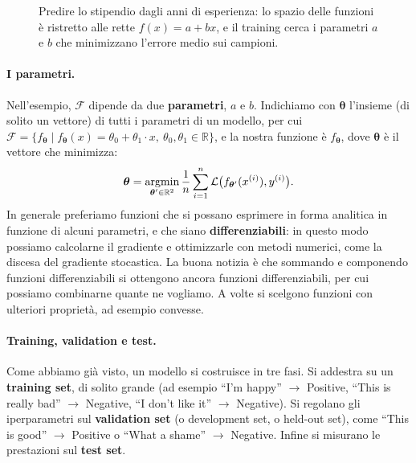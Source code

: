 \begin{figure}[htbp]
\centering
{}
\caption{Predire lo stipendio dagli anni di esperienza: lo spazio delle funzioni è ristretto alle rette $f(x) = a + bx$, e il training cerca i parametri $a$ e $b$ che minimizzano l'errore medio sui campioni.}
\label{fig:stipendio}
\end{figure}

\paragraph{I parametri.} Nell'esempio, $\mathcal{F}$ dipende da due \textbf{parametri}, $a$ e $b$. Indichiamo con $\boldsymbol{\theta}$ l'insieme (di solito un vettore) di tutti i parametri di un modello, per cui $\mathcal{F} = \{f_{\boldsymbol{\theta}} \mid f_{\boldsymbol{\theta}}(x) = \theta_0 + \theta_1 \cdot x,\ \theta_0, \theta_1 \in \mathbb{R}\}$, e la nostra funzione è $f_{\boldsymbol{\theta}}$, dove $\boldsymbol{\theta}$ è il vettore che minimizza:
\begin{equation}
\boldsymbol{\theta} = \operatorname*{argmin}_{\boldsymbol{\theta}' \in \mathbb{R}^2} \frac{1}{n} \sum_{i=1}^{n} \mathcal{L}\big(f_{\boldsymbol{\theta}'}(x^{(i)}), y^{(i)}\big).
\end{equation}
In generale preferiamo funzioni che si possano esprimere in forma analitica in funzione di alcuni parametri, e che siano \textbf{differenziabili}: in questo modo possiamo calcolarne il gradiente e ottimizzarle con metodi numerici, come la discesa del gradiente stocastica. La buona notizia è che sommando e componendo funzioni differenziabili si ottengono ancora funzioni differenziabili, per cui possiamo combinarne quante ne vogliamo. A volte si scelgono funzioni con ulteriori proprietà, ad esempio convesse.

\paragraph{Training, validation e test.} Come abbiamo già visto, un modello si costruisce in tre fasi. Si addestra su un \textbf{training set}, di solito grande (ad esempio \enquote{I'm happy} $\to$ Positive, \enquote{This is really bad} $\to$ Negative, \enquote{I don't like it} $\to$ Negative). Si regolano gli iperparametri sul \textbf{validation set} (o development set, o held-out set), come \enquote{This is good} $\to$ Positive o \enquote{What a shame} $\to$ Negative. Infine si misurano le prestazioni sul \textbf{test set}.

